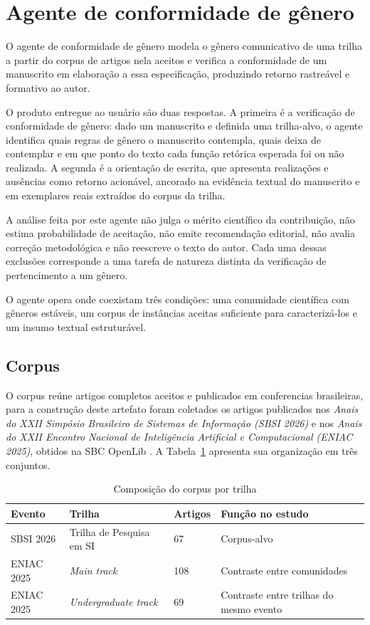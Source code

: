 \section{Agente de conformidade de gênero}
\label{sec:agente-conformidade}

O agente de conformidade de gênero modela o gênero comunicativo de uma trilha a partir do corpus de artigos nela aceitos e verifica a conformidade de um manuscrito em elaboração a essa especificação, produzindo retorno rastreável e formativo ao autor.

O produto entregue ao usuário são duas respostas. A primeira é a verificação de conformidade de gênero: dado um manuscrito e definida uma trilha-alvo, o agente identifica quais regras de gênero o manuscrito contempla, quais deixa de contemplar e em que ponto do texto cada função retórica esperada foi ou não realizada. A segunda é a orientação de escrita, que apresenta realizações e ausências como retorno acionável, ancorado na evidência textual do manuscrito e em exemplares reais extraídos do corpus da trilha.

A análise feita por este agente não julga o mérito científico da contribuição, não estima probabilidade de aceitação, não emite recomendação editorial, não avalia correção metodológica e não reescreve o texto do autor. Cada uma dessas exclusões corresponde a uma tarefa de natureza distinta da verificação de pertencimento a um gênero.

O agente opera onde coexistam três condições: uma comunidade científica com gêneros estáveis, um corpus de instâncias aceitas suficiente para caracterizá-los e um insumo textual estruturável.

\subsection{Corpus}
\label{sec:corpus-conformidade}

O corpus reúne artigos completos aceitos e publicados em conferencias brasileiras, para a construção deste artefato foram coletados os artigos publicados nos \textit{Anais do XXII Simpósio Brasileiro de Sistemas de Informação (SBSI 2026)} e nos \textit{Anais do XXII Encontro Nacional de Inteligência Artificial e Computacional (ENIAC 2025)}, obtidos na SBC OpenLib \cite{solsbc}. A Tabela~\ref{tab:corpus} apresenta sua organização em três conjuntos.

\begin{table}[H]
\centering
\caption{Composição do corpus por trilha}
\label{tab:corpus}
\small
\begin{tabular}{|p{4.4cm}|p{3.4cm}|p{1.6cm}|p{4.0cm}|}
\hline
\textbf{Evento} & \textbf{Trilha} & \textbf{Artigos} & \textbf{Função no estudo} \\
\hline
SBSI 2026 & Trilha de Pesquisa em SI & 67 & Corpus-alvo \\
\hline
ENIAC 2025 & \textit{Main track} & 108 & Contraste entre comunidades \\
\hline
ENIAC 2025 & \textit{Undergraduate track} & 69 & Contraste entre trilhas do mesmo evento \\
\hline
\end{tabular}
\end{table}

